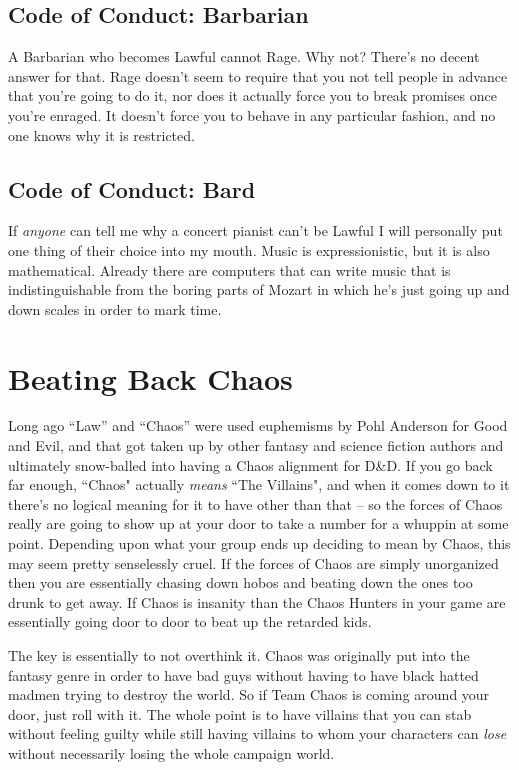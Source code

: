 \subsection{Code of Conduct: Barbarian}
A Barbarian who becomes Lawful cannot Rage. Why not? There's no decent answer for that. Rage doesn't seem to require that you not tell people in advance that you're going to do it, nor does it actually force you to break promises once you're enraged. It doesn't force you to behave in any particular fashion, and no one knows why it is restricted.

\subsection{Code of Conduct: Bard}
If \textit{anyone} can tell me why a concert pianist can't be Lawful I will personally put one thing of their choice into my mouth. Music is expressionistic, but it is also mathematical. Already there are computers that can write music that is indistinguishable from the boring parts of Mozart in which he's just going up and down scales in order to mark time.

\section{Beating Back Chaos}
Long ago ``Law'' and ``Chaos'' were used euphemisms by Pohl Anderson for Good and Evil, and that got taken up by other fantasy and science fiction authors and ultimately snow-balled into having a Chaos alignment for D\&D. If you go back far enough, ``Chaos" actually \textit{means} ``The Villains", and when it comes down to it there's no logical meaning for it to have other than that -- so the forces of Chaos really are going to show up at your door to take a number for a whuppin at some point. Depending upon what your group ends up deciding to mean by Chaos, this may seem pretty senselessly cruel. If the forces of Chaos are simply unorganized then you are essentially chasing down hobos and beating down the ones too drunk to get away. If Chaos is insanity than the Chaos Hunters in your game are essentially going door to door to beat up the retarded kids.

The key is essentially to not overthink it. Chaos was originally put into the fantasy genre in order to have bad guys without having to have black hatted madmen trying to destroy the world. So if Team Chaos is coming around your door, just roll with it. The whole point is to have villains that you can stab without feeling guilty while still having villains to whom your characters can \textit{lose} without necessarily losing the whole campaign world.

